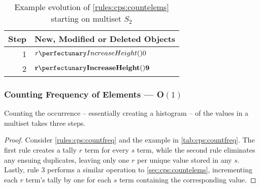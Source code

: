 \begin{table} \centering
   \begin{tabular}{|r|l|}
    \hline
    \textbf{Step} & \textbf{New, Modified or Deleted Objects} \\ \hline
    1 & \(\cpfunc{r}{0}\)\\ \hline
    
    2 & \(\mathbf{\cpfunc{r}{9}}\)\\ \hline
\end{tabular}
\caption[Example evolution of \cref{rules:cps:countelems}]{\label{tab:cps:countelems}Example evolution of \cref{rules:cps:countelems} starting on multiset \(S_2\)}
\end{table}

\subsubsection{Counting Frequency of Elements --- O\((1)\)}\label{sec:cps:countfreq}

\begin{proposition}\label{prop:cps:countfreq}
Counting the occurrence -- essentially creating a histogram -- of the values in a multiset takes three steps.
\end{proposition}

\begin{proof}
Consider \cref{rules:cps:countfreq} and the example in \cref{tab:cps:countfreq}.  The first rule creates a tally \(r\) term for every \(s\) term, while the second rule eliminates any ensuing duplicates, leaving only one \(r\) per unique value stored in any \(s\).  Lastly, rule 3 performs a similar operation to \cref{sec:cps:countelems}, incrementing each \(r\) term's tally by one for each \(s\) term containing the corresponding value.
\end{proof}

\begin{cprulesetfloat}
\begin{cpruleset}


\end{cpruleset}
\caption{\label{rules:cps:countfreq}\Gls{ruleset} to count the occurrence frequency of elements in a multiset}
\end{cprulesetfloat}


